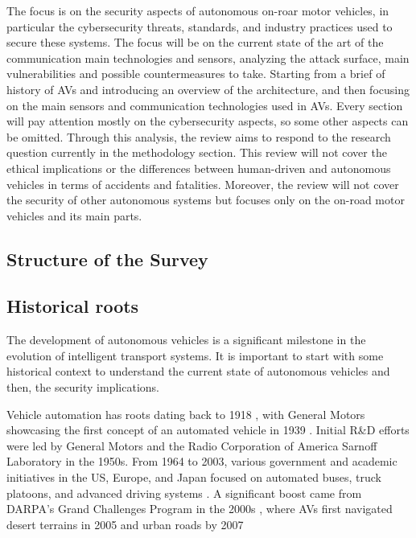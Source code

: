 The focus is on the security aspects of autonomous on-roar motor vehicles,
in particular the cybersecurity threats, standards, and industry practices used to secure these systems.
The focus will be on the current state of the art of the communication main technologies and sensors,
analyzing the attack surface, main vulnerabilities and possible countermeasures to take.
Starting from a brief of history of AVs and introducing an overview of the architecture, and then focusing on the main sensors and communication technologies used in AVs.
Every section will pay attention mostly on the cybersecurity aspects, so some other aspects can be omitted.
Through this analysis, the review aims to respond to the research question currently in the methodology section.
This review will not cover the ethical implications or the differences between human-driven and autonomous vehicles in terms of accidents and fatalities.
Moreover, the review will not cover the security of other autonomous systems
but focuses only on the on-road motor vehicles and its main parts.

\subsection{Structure of the Survey}\label{subsec:structure-of-the-survey}

\subsection{Historical roots}\label{subsec:historical-roots}

The development of autonomous vehicles is a significant milestone in the evolution of intelligent transport systems.
It is important to start with some historical context to understand the current state of autonomous vehicles and then,
the security implications.

Vehicle automation has roots dating back to 1918 \cite{pendleton2017perception} ,
with General Motors showcasing the first concept of an automated vehicle in 1939 \cite{shladover2017connected} .
Initial R\&D efforts were led by General Motors and the Radio Corporation of America Sarnoff Laboratory in the 1950s.
From 1964 to 2003, various government and academic initiatives in the US, Europe,
and Japan focused on automated buses, truck platoons, and advanced driving systems
\cite{shladover2017connected} .
A significant boost came from DARPA’s Grand Challenges Program in the 2000s \cite{darpa_grand_challenges_book},
where AVs first navigated desert terrains in 2005 and urban roads by 2007 \cite{pendleton2017perception, shladover2017connected}

